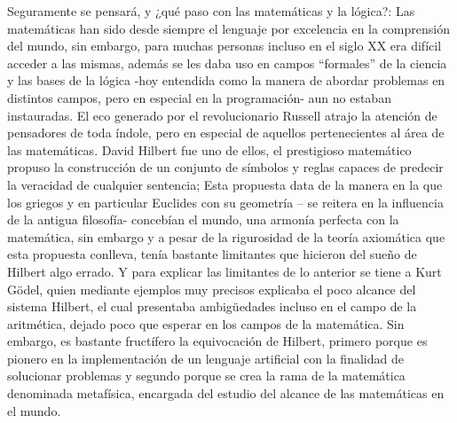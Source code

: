 \documentclass{article}
\begin{document}
Seguramente se pensará, y ¿qué paso con las matemáticas y la lógica?: Las matemáticas han sido desde siempre el lenguaje por excelencia en la comprensión del mundo, sin embargo, para muchas personas incluso en el siglo XX era difícil acceder a las mismas, además se les daba uso en campos “formales” de la ciencia y las bases de la lógica -hoy entendida como la manera de abordar problemas en distintos campos, pero en especial en la programación- aun no estaban instauradas. El eco generado por el revolucionario Russell atrajo la atención de pensadores de toda índole, pero en especial de aquellos pertenecientes al área de las matemáticas. David Hilbert fue uno de ellos, el prestigioso matemático propuso la construcción de un conjunto de símbolos y reglas capaces de predecir la veracidad de cualquier sentencia;  Esta propuesta data de la manera en la que los griegos y en particular Euclides con su geometría – se reitera en la influencia de la antigua filosofía- concebían el mundo, una armonía perfecta con la matemática, sin embargo y a pesar de la rigurosidad de la teoría axiomática que esta propuesta conlleva, tenía bastante limitantes que hicieron del sueño de Hilbert algo errado. Y para explicar las limitantes de lo anterior se tiene a Kurt Gödel, quien mediante ejemplos muy precisos explicaba el poco alcance del sistema Hilbert, el cual presentaba ambigüedades incluso en el campo de la aritmética, dejado poco que esperar en los campos de la matemática. Sin embargo, es bastante fructífero la equivocación de Hilbert, primero porque es pionero en la implementación de un lenguaje artificial con la finalidad de solucionar problemas y segundo porque se crea la rama de la matemática denominada metafísica, encargada del estudio del alcance de las matemáticas en el mundo. 
\end{document}
